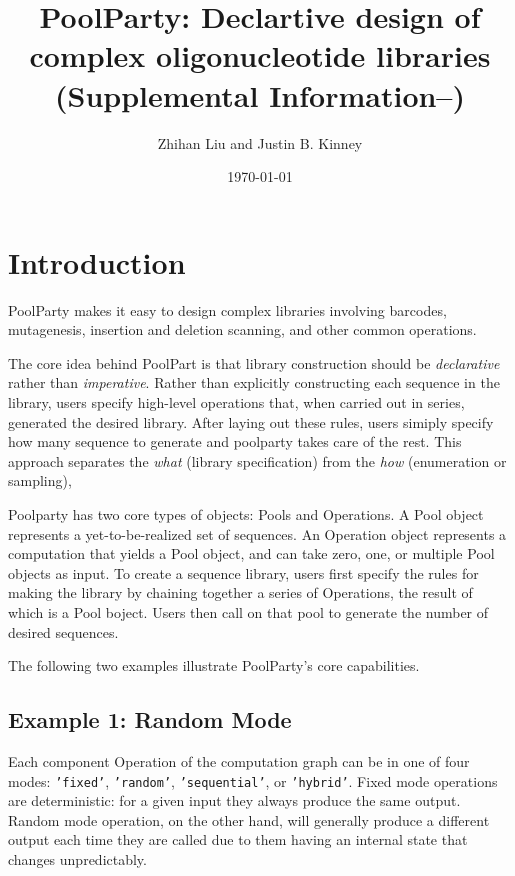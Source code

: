 \documentclass[11pt]{article}
\title{PoolParty: Declartive design of complex oligonucleotide libraries\\
(Supplemental Information--)}
\author{Zhihan Liu and Justin B. Kinney}
\date{\today}
\newcommand{\inpy}[1]{\texttt{#1}}
\begin{document}
\maketitle

\tableofcontents
\newpage


\section{Introduction}
\label{sec:introduction}

PoolParty makes it easy to design complex libraries involving barcodes, mutagenesis, insertion and deletion scanning, and other common operations.

The core idea behind PoolPart is that library construction should be \emph{declarative} rather than \emph{imperative}. Rather than explicitly constructing each sequence in the library, users specify high-level operations that, when carried out in series, generated the desired library. After laying out these rules, users simiply specify how many sequence to generate and poolparty takes care of the rest. This approach separates the \emph{what} (library specification) from the \emph{how} (enumeration or sampling),

Poolparty has two core types of objects: Pools and Operations. A Pool object represents a yet-to-be-realized set of sequences. An Operation object represents a computation that yields a Pool object, and can take zero, one, or multiple Pool objects as input.  To create a sequence library, users first specify the rules for making the library by chaining together a series of Operations, the result of which is a Pool boject. Users then call on that pool to generate the number of desired sequences.

The following two examples illustrate PoolParty's core capabilities.

\subsection{Example 1: Random Mode}
\label{subsec:example-random}

Each component Operation of the computation graph can be in one of four modes: \inpy{'fixed'}, \inpy{'random'}, \inpy{'sequential'}, or \inpy{'hybrid'}.  Fixed mode operations are deterministic: for a given input they always produce the same output. Random mode operation, on the other hand, will generally produce a different output each time they are called due to them having an internal state that changes unpredictably.
\end{document}
